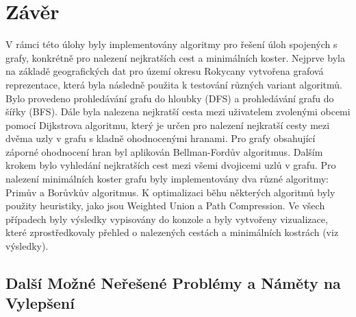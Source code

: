 \section{Závěr}

V rámci této úlohy byly implementovány algoritmy pro řešení úloh spojených s grafy, konkrétně pro nalezení nejkratších cest a minimálních koster. Nejprve byla na základě geografických dat pro území okresu Rokycany vytvořena grafová reprezentace, která byla následně použita k testování různých variant algoritmů. Bylo provedeno prohledávání grafu do hloubky (DFS) a prohledávání grafu do šířky (BFS). Dále byla nalezena nejkratší cesta mezi uživatelem zvolenými obcemi pomocí Dijkstrova algoritmu, který je určen pro nalezení nejkratší cesty mezi dvěma uzly v grafu s kladně ohodnocenými hranami. Pro grafy obsahující záporné ohodnocení hran byl aplikován Bellman-Fordův algoritmus. Dalším krokem bylo vyhledání nejkratších cest mezi všemi dvojicemi uzlů v grafu. Pro nalezení minimálních koster grafu byly implementovány dva různé algoritmy: Primův a Borůvkův algoritmus. K optimalizaci běhu některých algoritmů byly použity heuristiky, jako jsou Weighted Union a Path Compression. Ve všech případech byly výsledky vypisovány do konzole a byly vytvořeny vizualizace, které zprostředkovaly přehled o nalezených cestách a minimálních kostrách (viz výsledky).

\subsection{Další Možné Neřešené Problémy a Náměty na Vylepšení}

